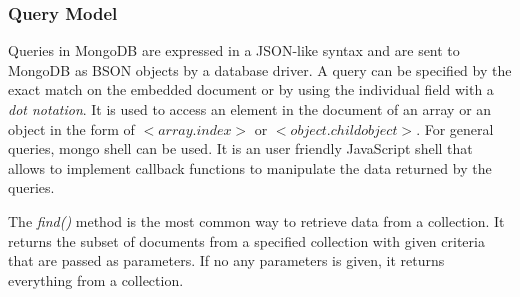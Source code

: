 \subsubsection{Query Model} \label{mongo-query-model}

Queries in MongoDB are expressed in a JSON-like syntax and are sent to MongoDB as BSON objects by a database driver\citep{orend2010analysis}. A query can be specified by the exact match on the embedded document or by using the individual field with a \textit{dot notation}. It is used to access an element in the document of an array or an object in the form of  $<$$array$.$index$$>$ or  $<$$object$.$childobject$$>$. For general queries, mongo shell can be used. It is an user friendly JavaScript shell that allows to implement callback functions to manipulate the data returned by the queries.  

The \textit{find()} method is the most common way to retrieve data from a collection. It returns the subset of documents from a specified collection with given criteria that are passed as parameters. If no any parameters is given, it returns everything from a collection.  


